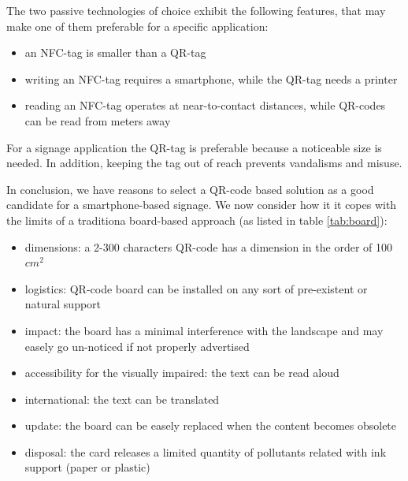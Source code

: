 \documentclass[sustainability,article,submit,pdftex,moreauthors]{Definitions/mdpi}
\begin{document}
The two passive technologies of choice exhibit the following features, that may make one of them preferable for a specific application:

\begin{itemize}
	\item an NFC-tag is smaller than a QR-tag
	\item writing an NFC-tag requires a smartphone, while the QR-tag needs a printer
	\item reading an NFC-tag operates at near-to-contact distances, while QR-codes can be read from meters away
\end{itemize}


For a signage application the QR-tag is preferable because a noticeable size is needed. In addition, keeping the tag out of reach prevents vandalisms and misuse.  

In conclusion, we have reasons to select a QR-code based solution as a good candidate for a smartphone-based signage. We now consider how it it copes with the limits of a traditiona board-based approach (as listed in table \ref{tab:board}):


\begin{itemize}
	\item dimensions: a 2-300 characters QR-code has a dimension in the order of 100 $cm^2$
	\item logistics: QR-code board can be installed on any sort of pre-existent or natural support
	\item impact: the board has a minimal interference with the landscape and may easely go un-noticed if not properly advertised
	\item accessibility for the visually impaired: the text can be read aloud
	\item international: the text can be translated
	\item update: the board can be easely replaced when the content becomes obsolete
	\item disposal: the card releases a limited quantity of pollutants related with ink support (paper or plastic)
\end{itemize}
		
		
\end{document}
